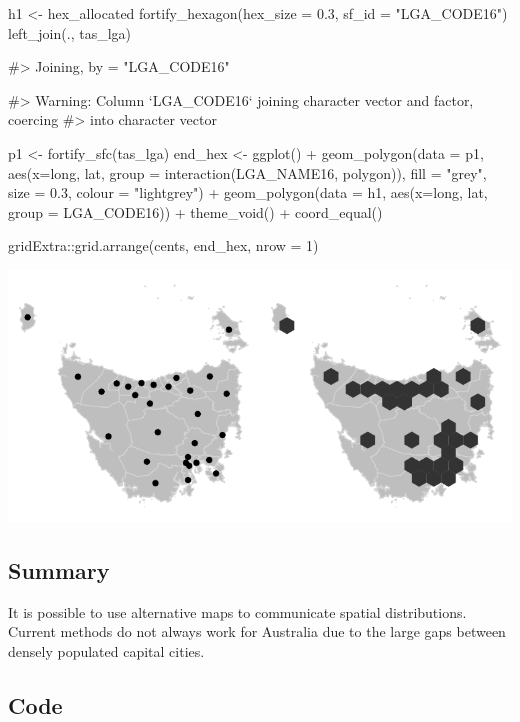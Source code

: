 \begin{Schunk}
\begin{Sinput}
h1 <- hex_allocated %
  fortify_hexagon(hex_size = 0.3, 
  sf_id = "LGA_CODE16") %
  left_join(., tas_lga)
\end{Sinput}
\begin{Soutput}
#> Joining, by = "LGA_CODE16"
\end{Soutput}
\begin{Soutput}
#> Warning: Column `LGA_CODE16` joining character vector and factor, coercing
#> into character vector
\end{Soutput}
\begin{Sinput}
p1 <- fortify_sfc(tas_lga)
end_hex <- ggplot() +
  geom_polygon(data = p1, aes(x=long, lat, group = interaction(LGA_NAME16, polygon)), fill = "grey", size = 0.3, colour = "lightgrey") +
  geom_polygon(data = h1, aes(x=long, lat, group = LGA_CODE16)) + theme_void() + coord_equal()

gridExtra::grid.arrange(cents, end_hex, nrow = 1)
\end{Sinput}

\includegraphics{algorithmRjournal_files/figure-latex/plot_final-1} \end{Schunk}

\hypertarget{summary}{%
\subsection{Summary}\label{summary}}

It is possible to use alternative maps to communicate spatial
distributions. Current methods do not always work for Australia due to
the large gaps between densely populated capital cities.

\hypertarget{code}{%
\subsection{Code}\label{code}}

